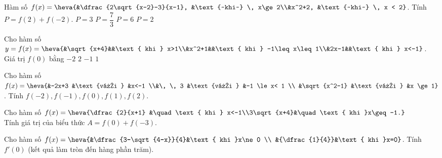 \begin{ex}%
	Hàm số $f(x)=\heva{&\dfrac{2\sqrt{x-2}-3}{x-1}, &\text{~khi~}  \, x\ge 2\\&x^2+2, &\text{~khi~} \, x < 2}$. Tính $P=f(2)+f(-2)$.
	 \choice
		 {\True $P=3$}
		 {$P=\dfrac{7}{3}$}
		{$P=6$} 
		{$P=2$} 
\end{ex}

\begin{ex}%
	Cho hàm số $y=f(x)=\heva{&\sqrt{x+4}&&\text{ khi } x>1\\&x^2+1&&\text{ khi } -1\leq x\leq  1\\&2x-1&&\text{ khi } x<-1}$. Giá trị $f(0)$ bằng
	\choice 
		{$-2$} 
		{$2$} 
		{$-1$} 
		{\True $1$} 
\end{ex}

\begin{bt}%
	Cho hàm số $f(x)=\heva{&-2x+3 &\text{với } &x<-1 \\&\, \, 3 &\text{với } &-1 \le x< 1 \\ &\sqrt{x^2-1} &\text{với } &x \ge 1}$.	Tính $f(-2), f(-1), f(0), f(1), f(2)$.
\end{bt}

\begin{bt}%
	Cho hàm số $f(x)=\heva{\dfrac{2}{x+1} &\quad\text{ khi } x<-1\\3\sqrt{x+4}&\quad\text{ khi }x\geq -1.}$\\
	Tính giá trị của biểu thức $A=f(0)+f(-3)$.
\end{bt}

\begin{ex}%
	Cho hàm số $f(x)=\heva{&\dfrac{3-\sqrt{4-x}}{4}&\text{  khi }x\ne 0 \\
	&{\dfrac{1}{4}}&\text{ khi }x=0}$. Tính $f'(0)$ (kết quả làm tròn đến hàng phần trăm). 
\end{ex}

